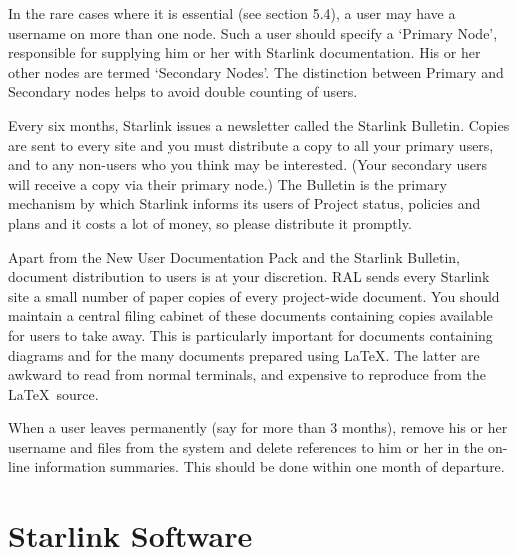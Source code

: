 In the rare cases where it is essential (see section 5.4), a user may have a
username on more than one node.
Such a user should specify a `Primary Node', responsible for supplying him
or her with Starlink documentation.
His or her other nodes are termed `Secondary Nodes'.
The distinction between Primary and Secondary nodes helps to avoid double
counting of users.

Every six months, Starlink issues a newsletter called the Starlink Bulletin.
Copies are sent to every site and you must distribute a copy to all
your primary users, and to any non-users who you think may be interested.
(Your secondary users will receive a copy via their primary node.)
The Bulletin is the primary mechanism by which Starlink informs its users of
Project status, policies and plans and it costs a lot of money, so please
distribute it promptly.

Apart from the New User Documentation Pack and the Starlink Bulletin, document
distribution to users is at your discretion.
RAL sends every Starlink site a small number of paper copies of every
project-wide document.
You should maintain a central filing cabinet of these documents containing
copies available for users to take away.
This is particularly important for documents containing diagrams and for the
many documents prepared using \LaTeX.
The latter are awkward to read from normal terminals, and expensive to reproduce
from the \LaTeX\ source.
 
When a user leaves permanently (say for more than 3 months), remove his or her
username and files from the system and delete references to him or her in the
on-line information summaries.
This should be done within one month of departure.

\section {Starlink Software}

